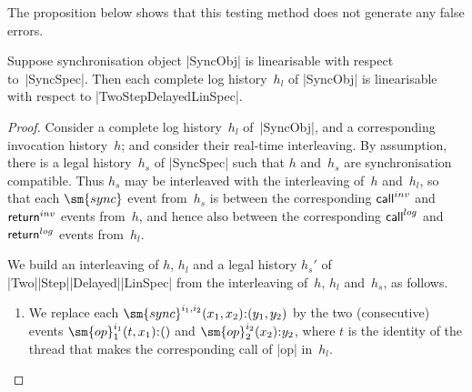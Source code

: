 The proposition below shows that this testing method does not generate any false
errors. 
%
\begin{prop}
Suppose synchronisation object |SyncObj| is linearisable with respect
to~|SyncSpec|.  Then each complete log history~$h_l$ of |SyncObj| is
linearisable with respect to |TwoStepDelayedLinSpec|.
\end{prop}


\begin{proof}
Consider a complete log history~$h_l$ of~|SyncObj|, and a corresponding
invocation history~$h$; and consider their real-time interleaving.  By
assumption, there is a legal history~$h_s$ of |SyncSpec| such that $h$
and~$h_s$ are synchronisation compatible.  Thus $h_s$ may be interleaved with
the interleaving of~$h$ and~$h_l$, so that each $\sm{sync}$ event from~$h_s$
is between the corresponding $\mathsf{call}^{inv}$ and $\mathsf{return}^{inv}$ events
from~$h$, and hence also between the corresponding $\mathsf{call}^{log}$ and
$\mathsf{return}^{log}$ events from~$h_l$.

We build an interleaving of $h$, $h_l$ and a legal history $h_s'$ of
|Two|\-|Step|\-|Delayed|\-|LinSpec| from the interleaving of~$h$, $h_l$
and~$h_s$, as follows.
%
\begin{enumerate}
\item We replace each $\sm{sync}^{i_1,i_2}(x_1,x_2) \:: (y_1,y_2)$ by
  the two (consecutive) events $\sm{op}_1^{i_1}(t,x_1) \:: ()$ and
  $\sm{op}_2^{i_2}(x_2) \:: y_2$, where $t$ is the identity of the thread that
  makes the corresponding call of |op| in~$h_l$.  


\end{enumerate}
\end{proof}
